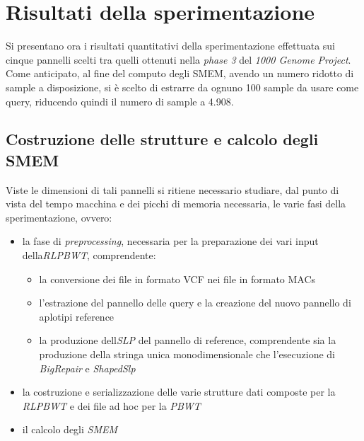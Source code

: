 \section{Risultati della sperimentazione}
Si presentano ora i risultati quantitativi della sperimentazione effettuata sui
cinque pannelli scelti tra quelli ottenuti nella \textit{phase 3} del
\textit{1000 Genome Project}. Come anticipato, al fine del computo degli SMEM,
avendo un numero 
ridotto di sample a disposizione, si è scelto di estrarre da ognuno 100 sample
da usare come query, riducendo quindi il numero di sample a 4.908.
\subsection{Costruzione delle strutture e calcolo degli SMEM}
Viste le dimensioni di tali pannelli si ritiene necessario studiare, dal punto
di vista del tempo macchina e dei picchi di memoria necessaria, le varie fasi
della sperimentazione, ovvero:
\begin{itemize}
  \item la fase di \textit{preprocessing}, necessaria per la preparazione dei
  vari input della\textit{RLPBWT}, comprendente: 
  \begin{itemize}
    \item la conversione dei file in formato VCF nei file in formato MACs
    \item l'estrazione del pannello delle query e la creazione del nuovo
    pannello di aplotipi reference
    \item la produzione dell\textit{SLP} del pannello di reference, comprendente
    sia la produzione della stringa unica monodimensionale che l'esecuzione di
    \textit{BigRepair} e \textit{ShapedSlp}
  \end{itemize}
  \item la costruzione e serializzazione delle varie strutture dati composte per
  la \textit{RLPBWT} e dei file ad hoc per la \textit{PBWT}
  \item il calcolo degli \textit{SMEM}
\end{itemize}

